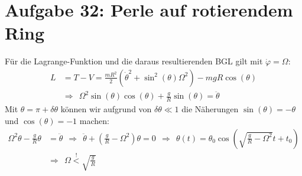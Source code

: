 \documentclass[a4paper,12pt]{article}
\begin{document}
\section*{Aufgabe 32: Perle auf rotierendem Ring}
Für die Lagrange-Funktion und die daraus resultierenden BGL gilt mit $\dot{\varphi}=\Omega$:
\begin{align*}
L&=T-V=\frac{mR^2}{2}(\dot{\theta}^2+\sin^2(\theta)\Omega^2)-mgR\cos(\theta)\\
&\Rightarrow\ \ \Omega^2\sin(\theta)\cos(\theta)+\frac{g}{R}\sin(\theta)=\ddot{\theta}
\end{align*}
Mit $\theta = \pi +\delta\theta$ können wir aufgrund von $\delta\theta\ll 1$ die Näherungen $\sin(\theta)=-\theta$ und $\cos(\theta)=-1$ machen:
\begin{align*}
\Omega^2\theta-\frac{g}{R}\theta &=\ddot{\theta}\ \ \Rightarrow\ \ \ddot{\theta} + (\frac{g}{R}-\Omega^2)\theta=0\ \ \Rightarrow\ \ \theta(t)=\theta_0\cos(\sqrt{\frac{g}{R}-\Omega^2}t+t_0)\\
&\Rightarrow\ \ \Omega \overset{!}{<} \sqrt{\frac{g}{R}}
\end{align*}
\end{document}
